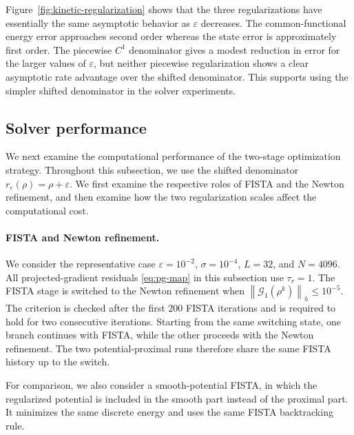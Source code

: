 \documentclass[11pt]{article}
\newcommand{\eps}{\varepsilon}
\newcommand{\sig}{\sigma}
\newcommand{\norm}[1]{\left\|#1\right\|}
\theoremstyle{plain}
\theoremstyle{definition}
\numberwithin{equation}{section}
\begin{document}
Figure~\ref{fig:kinetic-regularization} shows that the three
regularizations have essentially the same asymptotic behavior as
$\eps$ decreases. 
The common-functional energy error approaches second order whereas the state error is approximately first order.
The piecewise $C^1$ denominator gives a modest reduction in error for
the larger values of $\eps$, but neither piecewise regularization
shows a clear asymptotic rate advantage over the shifted denominator.
This supports using the simpler shifted denominator in the solver
experiments.

\subsection{Solver performance}
\label{subsec:num-solver}

We next examine the computational performance of the two-stage
optimization strategy. Throughout this subsection, we use the shifted
denominator $r_\eps(\rho)=\rho+\eps$. We first examine the
respective roles of FISTA and the Newton refinement, and then
examine how the two regularization scales affect the computational
cost.

\paragraph{FISTA and Newton refinement.}

We consider the representative case
$\eps=10^{-2}$, $\sig=10^{-4}$, $L=32$, and $N=4096$.
All projected-gradient residuals \eqref{eq:pg-map} in this subsection use $\tau_r=1$.
The FISTA stage is switched to the Newton refinement when
\(
\norm{\mathcal G_1(\rho^k)}_h\le10^{-5}.
\)
The criterion is checked after the first $200$ FISTA iterations and
is required to hold for two consecutive iterations. Starting from the
same switching state, one branch continues with FISTA, while the other
proceeds with the Newton refinement. The two potential-proximal runs
therefore share the same FISTA history up to the switch.

For comparison, we also consider a smooth-potential FISTA, in which
the regularized potential is included in the smooth part instead of the proximal part. 
It minimizes the same
discrete energy and uses the same FISTA backtracking rule.
\end{document}
